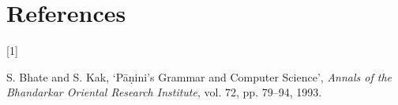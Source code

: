 \documentclass[
  a4paper,
]{article}
\newlength{\cslhangindent}
\newlength{\csllabelwidth}
\newlength{\cslentryspacingunit} %
\newenvironment{CSLReferences}[2] %
 {%
  \setlength{\parindent}{0pt}
  \ifodd #1
  \let\oldpar\par
  \def\par{\hangindent=\cslhangindent\oldpar}
  \fi
  \setlength{\parskip}{#2\cslentryspacingunit}
 }%
 {}
\newcommand{\CSLLeftMargin}[1]{\parbox[t]{\csllabelwidth}{#1}}
\newcommand{\CSLRightInline}[1]{\parbox[t]{\linewidth - \csllabelwidth}{#1}\break}
\begin{document}
\hypertarget{bibliography}{%
\section*{References}\label{bibliography}}

\hypertarget{refs}{}
\begin{CSLReferences}{0}{0}
\leavevmode{}%
\CSLLeftMargin{{[}1{]} }
\CSLRightInline{S. Bhate and S. Kak, {`{Pāṇini's Grammar and Computer
Science}'}, \emph{Annals of the Bhandarkar Oriental Research Institute},
vol. 72, pp. 79--94, 1993. }

\end{CSLReferences}
\end{document}

